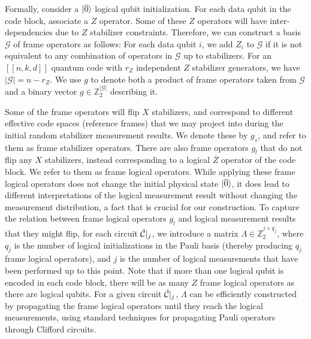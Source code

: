 Formally, consider a $|{\overline{0}}\rangle$ logical qubit initialization.
%
For each data qubit in the code block, associate a $Z$ operator.
%
Some of these $Z$ operators will have inter-dependencies due to $Z$ stabilizer constraints.
%
Therefore, we can construct a basis $\mathcal{G}$ of frame operators as follows:
%
For each data qubit $i$, we add $Z_i$ to $\mathcal{G}$ if it is not equivalent to any combination of operators in $\mathcal{G}$ up to stabilizers.
%
For an $[[n,k,d]]$ quantum code with $r_Z$ independent $Z$ stabilizer generators, we have $|\mathcal{G}|=n-r_Z$.
%
We use $g$ to denote both a product of frame operators taken from $\mathcal{G}$ and a binary vector $g\in \mathbb{Z}_2^{|\mathcal{G}|}$ describing it.

Some of the frame operators will flip $X$ stabilizers, and correspond to different effective code spaces (reference frames) that we may project into during the initial random stabilizer measurement results.
%
We denote these by $g_s$, and refer to them as frame stabilizer operators.
%
There are also frame operators $g_l$ that do not flip any $X$ stabilizers, instead corresponding to a logical $\overline{Z}$ operator of the code block.
%
We refer to them as frame logical operators.
%
While applying these frame logical operators does not change the initial physical state $|{\overline{0}}\rangle$, it does lead to different interpretations of the logical measurement result without changing the measurement distribution, a fact that is crucial for our construction.
%
To capture the relation between frame logical operators $g_l$ and logical measurement results that they might flip, for each circuit $\tilde{\mathcal{C}}|_j$, we introduce a matrix $\Lambda\in \mathbb{Z}_2^{j\times q_j}$, where $q_j$ is the number of logical initializations in the Pauli basis (thereby producing $q_j$ frame logical operators), and $j$ is the number of logical measurements that have been performed up to this point.
%
Note that if more than one logical qubit is encoded in each code block, there will be as many $Z$ frame logical operators as there are logical qubits.
%
For a given circuit $\tilde{\mathcal{C}}|_j$, $\Lambda$ can be efficiently constructed by propagating the frame logical operators until they reach the logical measurements, using standard techniques for propagating Pauli operators through Clifford circuits.

